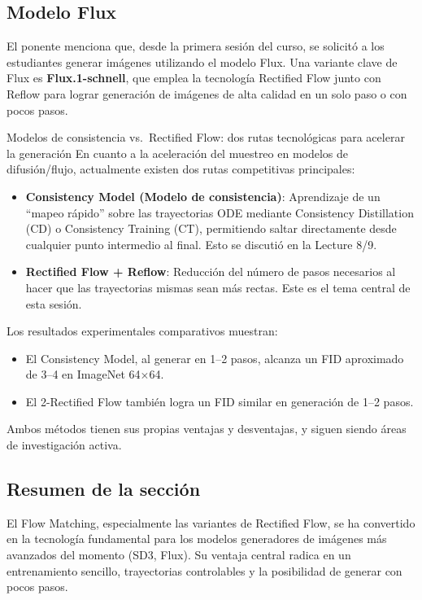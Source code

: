 \documentclass[a4paper]{article}
\begin{document}
\subsection{Modelo Flux}

El ponente menciona que, desde la primera sesión del curso, se solicitó a los estudiantes generar imágenes utilizando el modelo Flux. Una variante clave de Flux es \textbf{Flux.1-schnell}, que emplea la tecnología Rectified Flow junto con Reflow para lograr generación de imágenes de alta calidad en un solo paso o con pocos pasos.

\begin{knowledgebox}{Modelos de consistencia vs.\ Rectified Flow: dos rutas tecnológicas para acelerar la generación}
En cuanto a la aceleración del muestreo en modelos de difusión/flujo, actualmente existen dos rutas competitivas principales:
\begin{itemize}
    \item \textbf{Consistency Model (Modelo de consistencia)}: Aprendizaje de un ``mapeo rápido'' sobre las trayectorias ODE mediante Consistency Distillation (CD) o Consistency Training (CT), permitiendo saltar directamente desde cualquier punto intermedio al final. Esto se discutió en la Lecture 8/9.
    \item \textbf{Rectified Flow + Reflow}: Reducción del número de pasos necesarios al hacer que las trayectorias mismas sean más rectas. Este es el tema central de esta sesión.
\end{itemize}

Los resultados experimentales comparativos muestran:
\begin{itemize}
    \item El Consistency Model, al generar en 1--2 pasos, alcanza un FID aproximado de 3--4 en ImageNet 64$\times$64.
    \item El 2-Rectified Flow también logra un FID similar en generación de 1--2 pasos.
\end{itemize}
Ambos métodos tienen sus propias ventajas y desventajas, y siguen siendo áreas de investigación activa.
\end{knowledgebox}

\subsection{Resumen de la sección}

El Flow Matching, especialmente las variantes de Rectified Flow, se ha convertido en la tecnología fundamental para los modelos generadores de imágenes más avanzados del momento (SD3, Flux). Su ventaja central radica en un entrenamiento sencillo, trayectorias controlables y la posibilidad de generar con pocos pasos.
\end{document}
